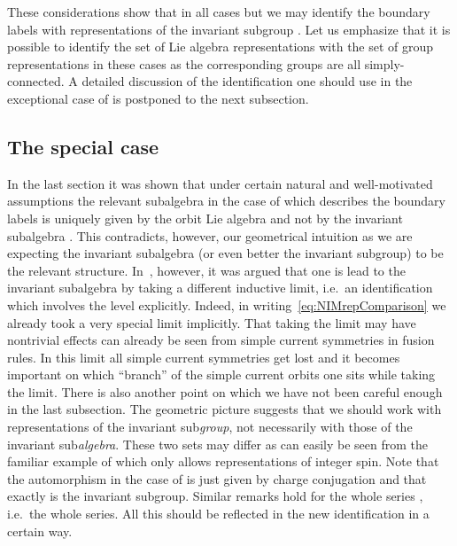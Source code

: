 \documentclass[12pt,a4paper]{article}
\providecommand{\mf}{\mathfrak} %
\def\iG{G^\omega} %
\def\sg{\mf{h}^\omega} %
\def\ig{\mf{g}^\omega} %
\begin{document}
\begin{appendix}
  These considerations show that in all cases but \coordHE{} we may identify
  the boundary labels with representations of the invariant subgroup \myHighlight{$\iG$}\coordHE{}.
  Let us emphasize that it is possible to identify the set of Lie algebra
  representations \myHighlight{$P_{\ig}^+$}\coordHE{} with the set of group representations \myHighlight{$P_{\iG}^+$}\coordHE{}
  in these cases as the corresponding groups \myHighlight{$\iG$}\coordHE{} are all simply-connected.
  A detailed discussion of the identification one should use in the
  exceptional case of \coordHE{} is postponed to the next subsection.

\subsection{The special case \coordHE{}}

  In the last section it was shown that under certain natural and
  well-motivated assumptions the relevant subalgebra \myHighlight{$\sg$}\coordHE{} in the case of
  \coordHE{} which describes the boundary labels is uniquely given by the
  orbit Lie algebra \coordHE{} and not by the
  invariant subalgebra \coordHE{}. This contradicts, however, our geometrical
  intuition as we are expecting the invariant subalgebra (or even better
  the invariant subgroup) to be the relevant structure.
  In~\cite{Quella:2001wh}, however, it was argued that one is lead to
  the invariant subalgebra by taking a different inductive limit, i.e.\ an
  identification which involves the level \coordHE{} explicitly. Indeed, in
  writing~\eqref{eq:NIMrepComparison} we already took a very special limit
  implicitly. That taking the limit \coordHE{} may have nontrivial effects
  can already be seen from simple current symmetries in fusion rules. In this
  limit all simple current symmetries get lost and it becomes important on
  which ``branch'' of the simple current orbits one sits while taking the
  limit. There is also another point on which we have not been careful enough
  in the last subsection. The geometric picture suggests that we should work
  with representations of the invariant sub{\em group}, not necessarily with
  those of the invariant sub{\em algebra}. These two sets may differ as can
  easily be seen from the familiar example of \coordHE{} which only allows
  \coordHE{} representations of integer spin. Note that the automorphism
  \myHighlight{$\omega$}\coordHE{} in the case of \coordHE{} is just given by charge conjugation and
  that \coordHE{} exactly is the invariant subgroup. Similar remarks hold
  for the whole series \coordHE{}, i.e.\ the whole
  \coordHE{} series. All this
  should be reflected in the new identification in a certain way.


\end{appendix}
\end{document}
